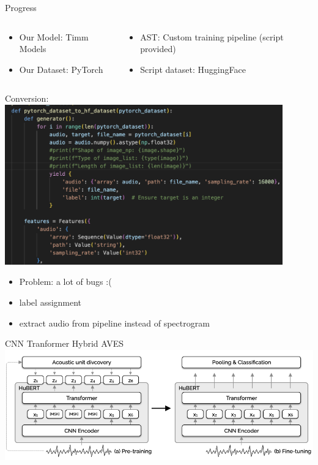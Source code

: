 \begin{frame}{Progress}
    \centering
    \begin{columns}
            \begin{column}{0.5\textwidth}
                \begin{itemize}
                    \item Our Model: Timm Models
                    \item Our Dataset: PyTorch
                \end{itemize}
            \end{column}
            \begin{column}{0.5\textwidth}
                \begin{itemize}
                    \item AST: Custom training pipeline (script provided)
                    \item Script dataset: HuggingFace
                \end{itemize}
            \end{column}
    \end{columns}
\end{frame}

\begin{frame}{Conversion:}
    \centering
    \includegraphics[height=0.7\textheight,width=0.9\textwidth,keepaspectratio]{images/converter.png}
    \begin{itemize}
        \item Problem: a lot of bugs :(
        \item label assignment
        \item extract audio from pipeline instead of spectrogram
    \end{itemize}
\end{frame}

\begin{frame}{CNN Tranformer Hybrid AVES}
    \centering
    \includegraphics[height=0.8\textheight,width=1\textwidth,keepaspectratio]{images/Aves_architecture.png}  
\end{frame}

